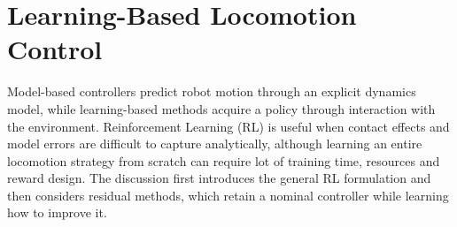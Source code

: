 \chapter{Learning-Based Locomotion Control}

Model-based controllers predict robot motion through an explicit dynamics
model, while learning-based methods acquire a policy through interaction with
the environment. Reinforcement Learning (RL) is useful when contact effects
and model errors are difficult to capture analytically, although learning an
entire locomotion strategy from scratch can require lot of training time, 
resources and reward design. The discussion first
introduces the general RL formulation and then considers residual
methods, which retain a nominal controller while learning how to improve it.\\
\


\newpage

